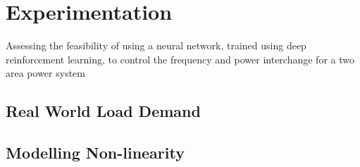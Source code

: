 \section{Experimentation}

Assessing the feasibility of using a neural network, trained using deep reinforcement learning, to control the frequency and power interchange for a two area power system 


\subsection{Real World Load Demand}


\subsection{Modelling Non-linearity}